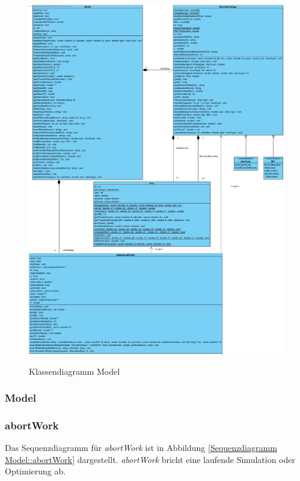 \begin{figure}[H]
	\centering
	\includegraphics[scale=.36]{Bilder/model.jpg}\\
	\caption{Klassendiagramm Model}
	\label{Klassendiagramm Model}
\end{figure}

\subsubsection{Model}

\subsubsection*{abortWork}

Das Sequenzdiagramm für \emph{abortWork} ist in Abbildung \ref{Sequenzdiagramm Model::abortWork} dargestellt. \emph{abortWork} bricht eine laufende Simulation oder Optimierung ab.

